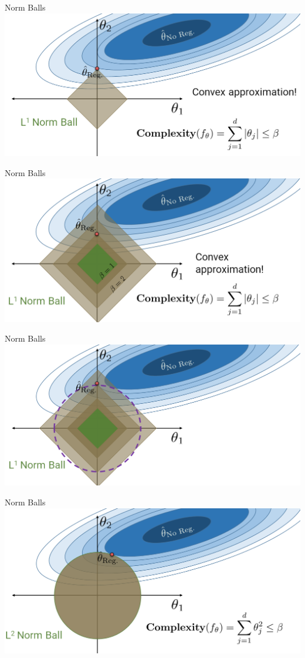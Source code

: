\documentclass[aspectratio=169]{../latex_main/tntbeamer}  %
\begin{document}
	
	\begin{frame}{Norm Balls}
	    \includegraphics[scale=.35]{Bild10}
	\end{frame}
	
	\begin{frame}{Norm Balls}
	    \includegraphics[scale=.35]{Bild11}
	\end{frame}
	
	\begin{frame}{Norm Balls}
	    \includegraphics[scale=.35]{Bild12}
	\end{frame}
	
	\begin{frame}{Norm Balls}
	    \includegraphics[scale=.35]{Bild13}
	\end{frame}
	
\end{document}
